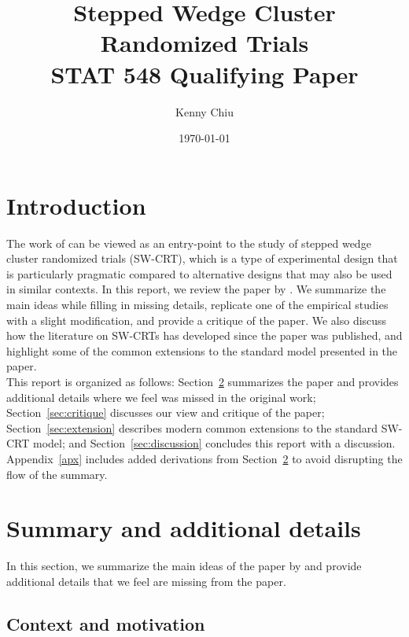 \documentclass[10pt]{article}
\title{Stepped Wedge Cluster Randomized Trials\\\vspace{0.5em}\large{STAT 548 Qualifying Paper}}
\author{Kenny Chiu}
\date{\today}
\begin{document}
\maketitle

\vspace{2em}

\begin{abstract}
\todo
\end{abstract}

\vspace{2em}


\section{Introduction}

The work of \textcite{Hussey:2007} can be viewed as an entry-point to the study of stepped wedge cluster randomized trials (SW-CRT), which is a type of experimental design that is particularly pragmatic compared to alternative designs that may also be used in similar contexts. In this report, we review the paper by \citeauthor{Hussey:2007}. We summarize the main ideas while filling in missing details, replicate one of the empirical studies with a slight modification, and provide a critique of the paper. We also discuss how the literature on SW-CRTs has developed since the paper was published, and highlight some of the common extensions to the standard model presented in the paper.
\\

This report is organized as follows: Section~\ref{sec:summary} summarizes the paper and provides additional details where we feel was missed in the original work; Section~\ref{sec:critique} discusses our view and critique of the paper; Section~\ref{sec:extension} describes modern common extensions to the standard SW-CRT model; and Section~\ref{sec:discussion} concludes this report with a discussion. Appendix~\ref{apx} includes added derivations from Section~\ref{sec:summary} to avoid disrupting the flow of the summary.


\section{Summary and additional details} \label{sec:summary}

In this section, we summarize the main ideas of the paper by \textcite{Hussey:2007} and provide additional details that we feel are missing from the paper.

\subsection{Context and motivation}
\end{document}
